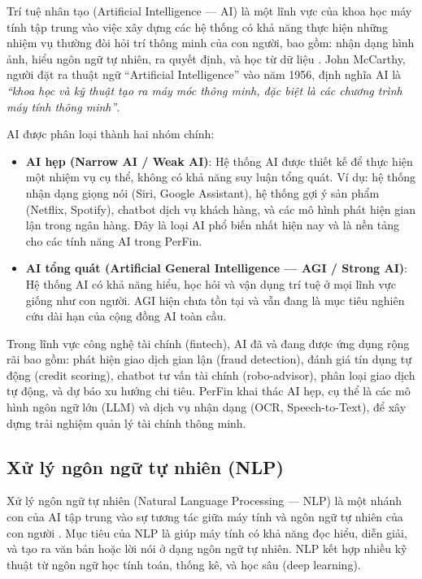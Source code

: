 Trí tuệ nhân tạo (Artificial Intelligence --- AI) là một lĩnh vực của khoa học máy tính tập trung vào việc xây dựng các hệ thống có khả năng thực hiện những nhiệm vụ thường đòi hỏi trí thông minh của con người, bao gồm: nhận dạng hình ảnh, hiểu ngôn ngữ tự nhiên, ra quyết định, và học từ dữ liệu \cite{ref7}. John McCarthy, người đặt ra thuật ngữ ``Artificial Intelligence'' vào năm 1956, định nghĩa AI là \textit{``khoa học và kỹ thuật tạo ra máy móc thông minh, đặc biệt là các chương trình máy tính thông minh''}.

AI được phân loại thành hai nhóm chính:

\begin{itemize}
    \item \textbf{AI hẹp (Narrow AI / Weak AI)}: Hệ thống AI được thiết kế để thực hiện một nhiệm vụ cụ thể, không có khả năng suy luận tổng quát. Ví dụ: hệ thống nhận dạng giọng nói (Siri, Google Assistant), hệ thống gợi ý sản phẩm (Netflix, Spotify), chatbot dịch vụ khách hàng, và các mô hình phát hiện gian lận trong ngân hàng. Đây là loại AI phổ biến nhất hiện nay và là nền tảng cho các tính năng AI trong PerFin.

    \item \textbf{AI tổng quát (Artificial General Intelligence --- AGI / Strong AI)}: Hệ thống AI có khả năng hiểu, học hỏi và vận dụng trí tuệ ở mọi lĩnh vực giống như con người. AGI hiện chưa tồn tại và vẫn đang là mục tiêu nghiên cứu dài hạn của cộng đồng AI toàn cầu.
\end{itemize}

Trong lĩnh vực công nghệ tài chính (fintech), AI đã và đang được ứng dụng rộng rãi bao gồm: phát hiện giao dịch gian lận (fraud detection), đánh giá tín dụng tự động (credit scoring), chatbot tư vấn tài chính (robo-advisor), phân loại giao dịch tự động, và dự báo xu hướng chi tiêu. PerFin khai thác AI hẹp, cụ thể là các mô hình ngôn ngữ lớn (LLM) và dịch vụ nhận dạng (OCR, Speech-to-Text), để xây dựng trải nghiệm quản lý tài chính thông minh.

\subsection{Xử lý ngôn ngữ tự nhiên (NLP)}
\label{subsec:nlp}

Xử lý ngôn ngữ tự nhiên (Natural Language Processing --- NLP) là một nhánh con của AI tập trung vào sự tương tác giữa máy tính và ngôn ngữ tự nhiên của con người \cite{ref8}. Mục tiêu của NLP là giúp máy tính có khả năng đọc hiểu, diễn giải, và tạo ra văn bản hoặc lời nói ở dạng ngôn ngữ tự nhiên. NLP kết hợp nhiều kỹ thuật từ ngôn ngữ học tính toán, thống kê, và học sâu (deep learning).

